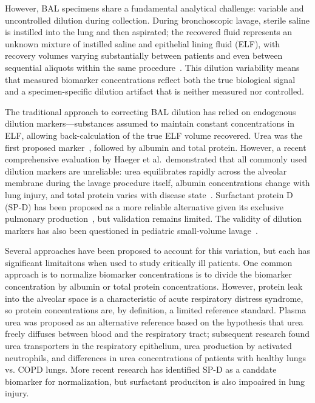 \documentclass[12pt]{article}
\begin{document}
However, BAL specimens share a fundamental analytical challenge: variable and uncontrolled dilution during collection. During bronchoscopic lavage, sterile saline is instilled into the lung and then aspirated; the recovered fluid represents an unknown mixture of instilled saline and epithelial lining fluid (ELF), with recovery volumes varying substantially between patients and even between sequential aliquots within the same procedure~\cite{Rennard1986,Baughman2007}. This dilution variability means that measured biomarker concentrations reflect both the true biological signal and a specimen-specific dilution artifact that is neither measured nor controlled.

The traditional approach to correcting BAL dilution has relied on endogenous dilution markers---substances assumed to maintain constant concentrations in ELF, allowing back-calculation of the true ELF volume recovered. Urea was the first proposed marker~\cite{Rennard1986}, followed by albumin and total protein. However, a recent comprehensive evaluation by Haeger et al.\ demonstrated that all commonly used dilution markers are unreliable: urea equilibrates rapidly across the alveolar membrane during the lavage procedure itself, albumin concentrations change with lung injury, and total protein varies with disease state~\cite{Haeger2024}. Surfactant protein D (SP-D) has been proposed as a more reliable alternative given its exclusive pulmonary production~\cite{Haeger2024,Chakrabarti2022,More2010}, but validation remains limited. The validity of dilution markers has also been questioned in pediatric small-volume lavage~\cite{Dargaville1999}.

Several approaches have been proposed to account for this variation, but each has significant limitaitons when used to study critically ill patients. One common approach is to normalize biomarker concentrations is to divide the biomarker concentration by albumin or total protein concentrations. However, protein leak into the alveolar space is a characteristic of acute respiratory distress syndrome, so protein concentrations are, by definition, a limited reference standard. Plasma urea was proposed as an alternative reference based on the hypothesis that urea freely diffuses between blood and the respiratory tract; subsequent research found urea transporters in the respiratory epithelium, urea production by activated neutrophils, and differences in urea concentrations of patients with healthy lungs vs. COPD lungs. More recent research has identified SP-D as a canddate biomarker for normalization, but surfactant produciton is also impoaired in lung injury.
\end{document}
